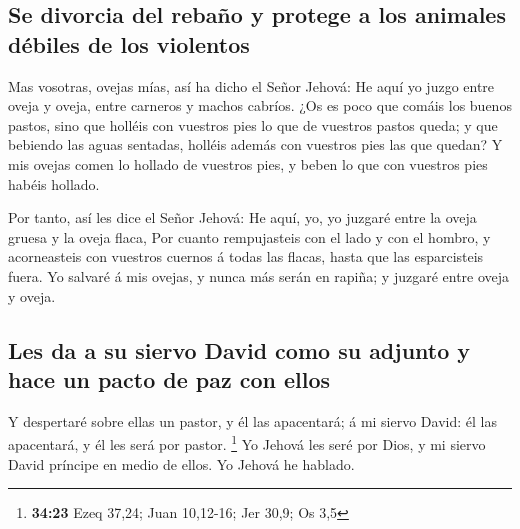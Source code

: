 \hypertarget{se-divorcia-del-rebauxf1o-y-protege-a-los-animales-duxe9biles-de-los-violentos}{%
\subsection{Se divorcia del rebaño y protege a los animales débiles de
los
violentos}\label{se-divorcia-del-rebauxf1o-y-protege-a-los-animales-duxe9biles-de-los-violentos}}

 Mas vosotras, ovejas mías, así ha dicho el Señor Jehová:
He aquí yo juzgo entre oveja y oveja, entre carneros y machos cabríos.
 ¿Os es poco que comáis los buenos pastos, sino que holléis
con vuestros pies lo que de vuestros pastos queda; y que bebiendo las
aguas sentadas, holléis además con vuestros pies las que quedan?
 Y mis ovejas comen lo hollado de vuestros pies, y beben lo
que con vuestros pies habéis hollado.

 Por tanto, así les dice el Señor Jehová: He aquí, yo, yo
juzgaré entre la oveja gruesa y la oveja flaca,  Por cuanto
rempujasteis con el lado y con el hombro, y acorneasteis con vuestros
cuernos á todas las flacas, hasta que las esparcisteis fuera.
 Yo salvaré á mis ovejas, y nunca más serán en rapiña; y
juzgaré entre oveja y oveja.

\hypertarget{les-da-a-su-siervo-david-como-su-adjunto-y-hace-un-pacto-de-paz-con-ellos}{%
\subsection{Les da a su siervo David como su adjunto y hace un pacto de
paz con
ellos}\label{les-da-a-su-siervo-david-como-su-adjunto-y-hace-un-pacto-de-paz-con-ellos}}

 Y despertaré sobre ellas un pastor, y él las apacentará; á
mi siervo David: él las apacentará, y él les será por pastor.
\footnote{\textbf{34:23} Ezeq 37,24; Juan 10,12-16; Jer 30,9; Os 3,5}
 Yo Jehová les seré por Dios, y mi siervo David príncipe en
medio de ellos. Yo Jehová he hablado.

